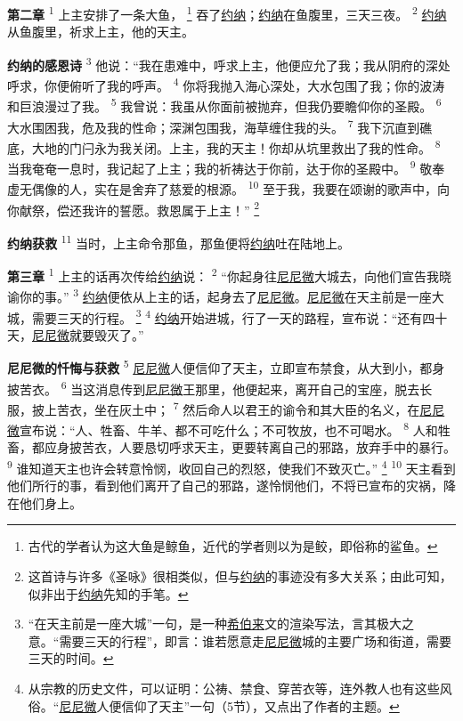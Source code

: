\textbf{第二章\quad}
\textsuperscript{1}
上主安排了一条大鱼，
\footnote{古代的学者认为这大鱼是鲸鱼，近代的学者则以为是鲛，即俗称的鲨鱼。}
吞了\uline{约纳}；\uline{约纳}在鱼腹里，三天三夜。
\textsuperscript{2}
\uline{约纳}从鱼腹里，祈求上主，他的天主。

\textbf{约纳的感恩诗\quad}
\textsuperscript{3}
他说：“我在患难中，呼求上主，他便应允了我；我从阴府的深处呼求，你便俯听了我的呼声。
\textsuperscript{4}
你将我抛入海心深处，大水包围了我；你的波涛和巨浪漫过了我。
\textsuperscript{5}
我曾说：我虽从你面前被抛弃，但我仍要瞻仰你的圣殿。
\textsuperscript{6}
大水围困我，危及我的性命；深渊包围我，海草缠住我的头。
\textsuperscript{7}
我下沉直到礁底，大地的门闩永为我关闭。上主，我的天主！你却从坑里救出了我的性命。
\textsuperscript{8}
当我奄奄一息时，我记起了上主；我的祈祷达于你前，达于你的圣殿中。
\textsuperscript{9}
敬奉虚无偶像的人，实在是舍弃了慈爱的根源。
\textsuperscript{10}
至于我，我要在颂谢的歌声中，向你献祭，偿还我许的誓愿。救恩属于上主！”
\footnote{这首诗与许多《圣咏》很相类似，但与\uline{约纳}的事迹没有多大关系；由此可知，似非出于\uline{约纳}先知的手笔。}

\textbf{约纳获救\quad}
\textsuperscript{11}
当时，上主命令那鱼，那鱼便将\uline{约纳}吐在陆地上。

\textbf{第三章\quad}
\textsuperscript{1}
上主的话再次传给\uline{约纳}说：
\textsuperscript{2}
“你起身往\uline{尼尼微}大城去，向他们宣告我晓谕你的事。”
\textsuperscript{3}
\uline{约纳}便依从上主的话，起身去了\uline{尼尼微}。\uline{尼尼微}在天主前是一座大城，需要三天的行程。
\footnote{“在天主前是一座大城”一句，是一种\uline{希伯来}文的渲染写法，言其极大之意。“需要三天的行程”，即言：谁若愿意走\uline{尼尼微}城的主要广场和街道，需要三天的时间。}
\textsuperscript{4}
\uline{约纳}开始进城，行了一天的路程，宣布说：“还有四十天，\uline{尼尼微}就要毁灭了。”

\textbf{尼尼微的忏悔与获救\quad}
\textsuperscript{5}
\uline{尼尼微}人便信仰了天主，立即宣布禁食，从大到小，都身披苦衣。
\textsuperscript{6}
当这消息传到\uline{尼尼微}王那里，他便起来，离开自己的宝座，脱去长服，披上苦衣，坐在灰土中；
\textsuperscript{7}
然后命人以君王的谕令和其大臣的名义，在\uline{尼尼微}宣布说：“人、牲畜、牛羊、都不可吃什么；不可牧放，也不可喝水。
\textsuperscript{8}
人和牲畜，都应身披苦衣，人要恳切呼求天主，更要转离自己的邪路，放弃手中的暴行。
\textsuperscript{9}
谁知道天主也许会转意怜悯，收回自己的烈怒，使我们不致灭亡。”
\footnote{从宗教的历史文件，可以证明：公祷、禁食、穿苦衣等，连外教人也有这些风俗。“\uline{尼尼微}人便信仰了天主”一句（5节），又点出了作者的主题。}
\textsuperscript{10}
天主看到他们所行的事，看到他们离开了自己的邪路，遂怜悯他们，不将已宣布的灾祸，降在他们身上。

